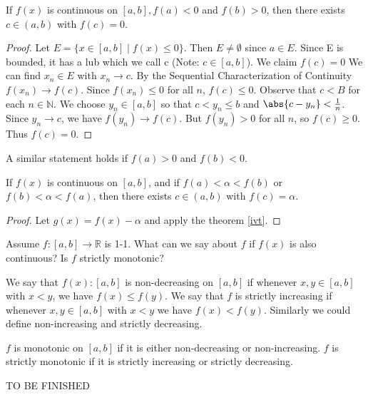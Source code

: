 
\begin{thm}
\label{ivt}
    If $f(x)$ is continuous on $[a,b], f(a)<0$ and $f(b)>0$, then there exists $c\in (a,b)$ with $f(c)=0$.
\end{thm}

\begin{proof}
    Let $E = \{x \in [a,b] \mid f(x) \leq 0 \}$. Then $E \neq \emptyset$ since $a \in E.$ Since E is bounded, it has a lub which we call c (Note: $c \in [a,b]$). We claim $f(c)=0$ We can find ${x_n} \in E$ with $x_n \to c$. By the Sequential Characterization of Continuity $f(x_n) \to f(c)$. Since $f(x_n)\leq 0$ for all $n$, $f(c) \leq 0$. Observe that $c<B$ for each $n\in\mathbb{N}$. We choose $y_n\in [a,b]$ so that $c<y_n \leq b$ and $\abs{c-y_n} < \frac{1}{n}$. Since $y_n\to c$, we have $f(y_n) \to f(c)$. But $f(y_n) > 0$ for all $n$, so $f(c) \geq 0$. Thus $f(c) = 0$.
\end{proof}

\begin{note}
A similar statement holds if $f(a) > 0$ and $f(b) < 0$.
\end{note}

\begin{cor}
If $f(x)$ is continuous on $[a,b]$, and if $f(a) < \alpha < f(b)$ or $f(b) < \alpha < f(a)$, then there exists $c\in (a,b)$ with $f(c) = \alpha $.
\end{cor}

\begin{proof}
    Let $g(x) = f(x) - \alpha$ and apply the theorem \ref{ivt}.
\end{proof}

\begin{ques}
Assume $f\colon [a,b]\to \mathbb{R}$ is 1-1. What can we say about $f$ if $f(x)$ is also continuous? Is $f$ strictly monotonic?
\end{ques}

\begin{defn}
We say that $f(x) \colon [a,b]$ is non-decreasing on $[a,b]$ if whenever $x,y\in [a,b]$ with $x<y$, we have $f(x)\leq f(y)$. We say that $f$ is strictly increasing if whenever $x,y\in [a,b]$ with $x<y$ we have $f(x) < f(y)$. Similarly we could define non-increasing and strictly decreasing.
\end{defn}

$f$ is monotonic on $[a,b]$ if it is either non-decreasing or non-increasing. $f$ is strictly monotonic if it is strictly increasing or strictly decreasing.

\begin{cor}

\end{cor}

TO BE FINISHED